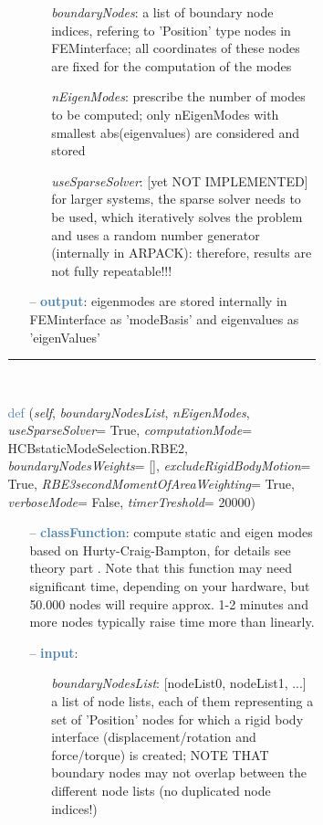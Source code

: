 \begin{itemize}[leftmargin=1.4cm]
\begin{itemize}[leftmargin=1.4cm]
\begin{itemize}[leftmargin=1.4cm]
\begin{itemize}[leftmargin=0.5cm]
\begin{itemize}[leftmargin=1.4cm]
\begin{itemize}[leftmargin=1.4cm]
\begin{itemize}[leftmargin=0.5cm]
\begin{itemize}[leftmargin=0.7cm]
\begin{itemize}[leftmargin=1.2cm]
\setlength{\itemindent}{-0.7cm}
\item[]{\it boundaryNodes}: a list of boundary node indices, refering to 'Position' type nodes in FEMinterface; all coordinates of these nodes are fixed for the computation of the modes
\item[]{\it nEigenModes}: prescribe the number of modes to be computed; only nEigenModes with smallest abs(eigenvalues) are considered and stored
\item[]{\it useSparseSolver}: [yet NOT IMPLEMENTED] for larger systems, the sparse solver needs to be used, which iteratively solves the problem and uses a random number generator (internally in ARPACK): therefore, results are not fully repeatable!!!
\end{itemize}
\item[--]\textcolor{steelblue}{\bf output}: eigenmodes are stored internally in FEMinterface as 'modeBasis' and eigenvalues as 'eigenValues'
\vspace{12pt}\end{itemize}
%
\noindent\rule{8cm}{0.75pt}\vspace{1pt} \\ 
\begin{flushleft}
\noindent \textcolor{steelblue}{def {\bf {}}}\label{sec:FEM:FEMinterface:ComputeHurtyCraigBamptonModes}
({\it self}, {\it boundaryNodesList}, {\it nEigenModes}, {\it useSparseSolver}= True, {\it computationMode}= HCBstaticModeSelection.RBE2, {\it boundaryNodesWeights}= [], {\it excludeRigidBodyMotion}= True, {\it RBE3secondMomentOfAreaWeighting}= True, {\it verboseMode}= False, {\it timerTreshold}= 20000)
\end{flushleft}
\setlength{\itemindent}{0.7cm}
\begin{itemize}[leftmargin=0.7cm]
\item[--]\textcolor{steelblue}{\bf classFunction}: compute static  and eigen modes based on Hurty-Craig-Bampton, for details see theory part . Note that this function may need significant time, depending on your hardware, but 50.000 nodes will require approx. 1-2 minutes and more nodes typically raise time more than linearly.
\item[--]\textcolor{steelblue}{\bf input}: \vspace{-6pt}
\begin{itemize}[leftmargin=1.2cm]
\setlength{\itemindent}{-0.7cm}
\item[]{\it boundaryNodesList}: [nodeList0, nodeList1, ...] a list of node lists, each of them representing a set of 'Position' nodes for which a rigid body interface (displacement/rotation and force/torque) is created; NOTE THAT boundary nodes may not overlap between the different node lists (no duplicated node indices!)

\end{itemize}
\end{itemize}
\end{itemize}
\end{itemize}
\end{itemize}
\end{itemize}
\end{itemize}
\end{itemize}
\end{itemize}
